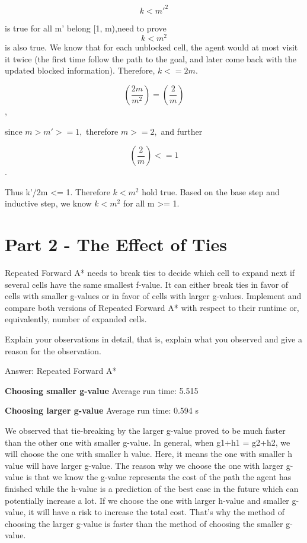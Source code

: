 \documentclass{article}
\begin{document}
$$k < m'^2$$
 
is true for all  m' belong [1, m),need to prove $$k < m^2$$ is also true. We know that for each unblocked cell, the agent would at most visit it twice (the first time follow the path to the goal, and later come back with the updated blocked information). Therefore, $k <= 2m.$ 

$$(\frac{2m}{m^2}) = (\frac{2}{m})$$, 

since $m > m' >= 1,$ therefore $m >= 2,$ and further 

$$(\frac{2}{m}) <= 1$$. 

Thus k'/2m <= 1. Therefore $k < m^2$ hold true.
Based on the base step and inductive step, we know $k < m^2$ for all m >= 1.




\section{Part 2 - The Effect of Ties}

Repeated Forward A* needs to break ties to decide which cell to expand next if
several cells have the same smallest f-value. It can either break ties in favor of cells with smaller g-values or in favor of
cells with larger g-values. Implement and compare both versions of Repeated Forward A* with respect to their runtime or,
equivalently, number of expanded cells.


\begin{question}
	Explain your observations in detail, that is, explain what you observed and give a
reason for the observation.

\end{question}

Answer: \newline
Repeated Forward A*

\textbf{Choosing smaller g-value}
Average run time: 5.515

\textbf{Choosing larger g-value}
Average run time: 0.594 s
\par We observed that tie-breaking by the larger g-value proved to be much faster than the other one with smaller g-value. In general, when g1+h1 = g2+h2, we will choose the one with smaller h value. Here, it means the one with smaller h value will have larger g-value. The reason why we choose the one with larger g-value is that we know the g-value represents the cost of the path the agent has finished while the h-value is a prediction of the best case in the future which can potentially increase a lot. If we choose the one with larger h-value and smaller g-value, it will have a risk to increase the total cost. That's why the method of choosing the larger g-value is faster than the method of choosing the smaller g-value.
\end{document}
